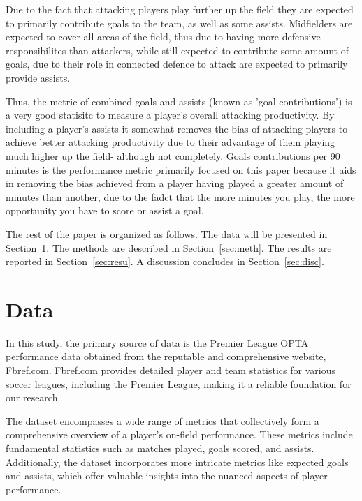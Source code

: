 \documentclass[12pt]{article}
\begin{document}
Due to the fact that attacking players
play further up the field they are expected to primarily contribute goals to the 
team, as well as some assists.
Midfielders are expected to cover all areas of the field, thus due to having
more defensive responsibilites than attackers, while still expected to
contribute some amount of goals, due to their role in connected defence to
attack are expected to primarily provide assists. 

Thus, the metric of combined goals and assists (known as 'goal contributions') is 
a very good statisitc to measure a player's overall attacking productivity.
By including a player's assists it somewhat removes the bias of attacking players
to achieve better attacking productivity due to their advantage of them playing 
much higher up the field- although not completely. Goals contributions per 90 
minutes is the performance metric primarily focused on this paper because it
aids in removing the bias achieved from a player having played a greater amount 
of minutes than another, due to the fadct that the more minutes you play, the
more opportunity you have to score or assist a goal.



The rest of the paper is organized as follows.
The data will be presented in Section~\ref{sec:data}.
The methods are described in Section~\ref{sec:meth}.
The results are reported in Section~\ref{sec:resu}.
A discussion concludes in Section~\ref{sec:disc}.


\section{Data}
\label{sec:data}



In this study, the primary source of data is the Premier League OPTA performance
data obtained from the reputable and comprehensive website, Fbref.com.
Fbref.com provides detailed player and team statistics for various soccer
leagues, including the Premier League, making it a reliable foundation for our
research.

The dataset encompasses a wide range of metrics that collectively form a
comprehensive overview of a player's on-field performance. These metrics include
fundamental statistics such as matches played, goals scored, and assists.
Additionally, the dataset incorporates more intricate metrics like expected goals
and assists, which offer valuable insights into the nuanced aspects of player
performance.
\end{document}
